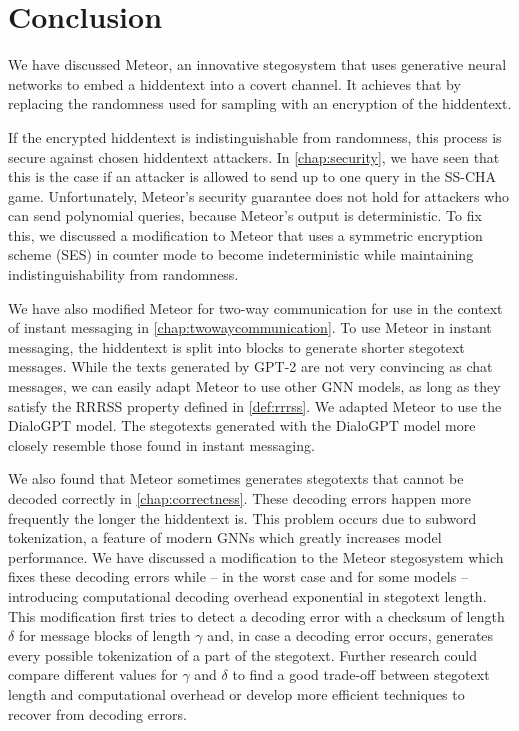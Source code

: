 \chapter{Conclusion}
\label{chap:conclusion}

We have discussed Meteor, an innovative stegosystem that uses generative neural networks to embed a hiddentext into a covert channel.
It achieves that by replacing the randomness used for sampling with an encryption of the hiddentext.

If the encrypted hiddentext is indistinguishable from randomness, this process is secure against chosen hiddentext attackers.
In \autoref{chap:security}, we have seen that this is the case if an attacker is allowed to send up to one query in the SS-CHA game.
Unfortunately, Meteor's security guarantee does not hold for attackers who can send polynomial queries, because Meteor's output is deterministic.
To fix this, we discussed a modification to Meteor that uses a symmetric encryption scheme (SES) in counter mode to become indeterministic while maintaining indistinguishability from randomness.

We have also modified Meteor for two-way communication for use in the context of instant messaging in \autoref{chap:twowaycommunication}.
To use Meteor in instant messaging, the hiddentext is split into blocks to generate shorter stegotext messages.
While the texts generated by GPT-2 are not very convincing as chat messages, we can easily adapt Meteor to use other GNN models, as long as they satisfy the RRRSS property defined in \autoref{def:rrrss}.
We adapted Meteor to use the DialoGPT model.
The stegotexts generated with the DialoGPT model more closely resemble those found in instant messaging.

We also found that Meteor sometimes generates stegotexts that cannot be decoded correctly in \autoref{chap:correctness}.
These decoding errors happen more frequently the longer the hiddentext is.
This problem occurs due to subword tokenization, a feature of modern GNNs which greatly increases model performance.
We have discussed a modification to the Meteor stegosystem which fixes these decoding errors while -- in the worst case and for some models -- introducing computational decoding overhead exponential in stegotext length.
This modification first tries to detect a decoding error with a checksum of length $\delta$ for message blocks of length $\gamma$ and, in case a decoding error occurs, generates every possible tokenization of a part of the stegotext.
Further research could compare different values for $\gamma$ and $\delta$ to find a good trade-off between stegotext length and computational overhead or develop more efficient techniques to recover from decoding errors.

